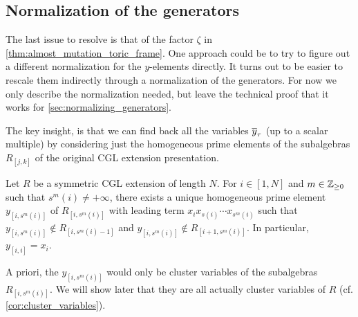 \subsection{Normalization of the generators}

The last issue to resolve is that of the factor $\zeta$ in
\cref{thm:almost_mutation_toric_frame}. One approach could be to try to figure out a
different normalization for the $y$-elements directly. It turns out to be easier to
rescale them indirectly through a normalization of the generators. For now we only
describe the normalization needed, but leave the technical proof that it works for
\cref{sec:normalizing_generators}.

\medskip

The key insight, is that we can find back all the variables $\overline{y}_{\tau}$ (up to a
scalar multiple) by considering just the homogeneous prime elements of the subalgebras
$R_{[j, k]}$ of the original CGL extension presentation.

\begin{theorem}\label{thm:y_square_brackets}

	Let $R$ be a symmetric CGL extension of length $N$. For $i\in [1, N]$ and $m \in
		\mathbb{Z}_{\geq 0}$ such that $s^m(i) \neq + \infty$, there exists a unique homogeneous
	prime element $y_{[i, s^m(i)]}$ of $R_{[i, s^m(i)]}$
	with leading term $x_i x_{s(i)} \cdots x_{s^m(i)}$ such that $y_{[i, s^m(i)]} \notin
		R_{[i, s^m(i) - 1]}$ and $y_{[i, s^m(i)]} \notin R_{[i+1, s^m(i)]}$. In particular,
	$y_{[i, i]} = x_i$.
\end{theorem}

A priori, the $y_{[i, s^m(i)]}$ would only be cluster variables of the subalgebras
$R_{[i, s^m(i)]}$. We will show later that they are all actually cluster variables of
$R$ (cf. \cref{cor:cluster_variables}).

